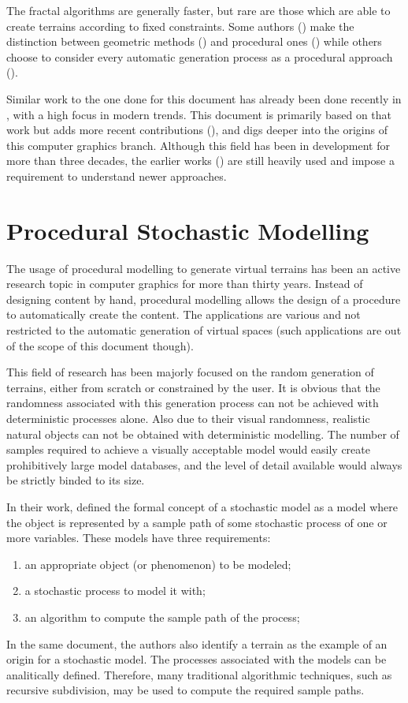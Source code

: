 \documentclass{acmtog}
\begin{document}
The fractal algorithms are generally faster, but rare are those which are able to create terrains according to fixed constraints. Some authors (\cite{Belhadj07}) make the distinction between geometric methods (\cite{Mandelbrot83,Fournier82,Miller86}) and procedural ones (\cite{Perlin85}) while others choose to consider every automatic generation process as a procedural approach (\cite{Smelik09}).

Similar work to the one done for this document has already been done recently in \cite{Smelik09}, with a high focus in modern trends. This document is primarily based on that work but adds more recent contributions (\cite{Chen11}), and digs deeper into the origins of this computer graphics branch. Although this field has been in development for more than three decades, the earlier works (\cite{Fournier82,Miller86}) are still heavily used and impose a requirement to understand newer approaches.

\section{Procedural Stochastic Modelling}
The usage of procedural modelling to generate virtual terrains has been an active research topic in computer graphics for more than thirty years. Instead of designing content by hand, procedural modelling allows the design of a procedure to automatically create the content. The applications are various and not restricted to the automatic generation of virtual spaces (such applications are out of the scope of this document though).

This field of research has been majorly focused on the random generation of terrains, either from scratch or constrained by the user. It is obvious that the randomness associated with this generation process can not be achieved with deterministic processes alone. Also due to their visual randomness, realistic natural objects can not be obtained with deterministic modelling. The number of samples required to achieve a visually acceptable model would easily create prohibitively large model databases, and the level of detail available would always be strictly binded to its size.

In their work, \cite{Fournier82} defined the formal concept of a stochastic model as a model where the object is represented by a sample path of some stochastic process of one or more variables. These models have three requirements:
\begin{enumerate}
\item{an appropriate object (or phenomenon) to be modeled;}
\item{a stochastic process to model it with;}
\item{an algorithm to compute the sample path of the process;}
\end{enumerate}
In the same document, the authors also identify a terrain as the example of an origin for a stochastic model. The processes associated with the models can be analitically defined. Therefore, many traditional algorithmic techniques, such as recursive subdivision, may be used to compute the required sample paths.
\end{document}
